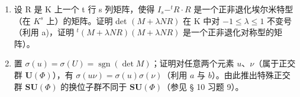 \begin{enumerate}
\def\labelenumi{\alph{enumi})}
\setcounter{enumi}{1}
\item
  设 R 是 K 上一个 t 行 s 列矩阵，使得 \(I_{s} - ^{t}R \cdot R\) 是一个正非退化埃尔米特型（在 \(K^{s}\) 上）的矩阵。证明 det \((M + \lambda NR)\) 在 K 中对 \(-1 \leqslant \lambda \leqslant 1\) 不变号（利用 a)，证明 \(^{t}(M + \lambda NR)(M + \lambda NR)\) 是一个正非退化对称型的矩阵）。
\item
  置 \(\sigma(u) = \sigma(U) = \operatorname{sgn}(\det M)\)；证明对任意两个元素 \(u\)、\(\nu\)（属于正交群 \(\mathbf{U}(\Phi)\)），有 \(\sigma(u\nu) = \sigma(u)\sigma(\nu)\)（利用 \(a\) 与 \(b\)）。由此推出特殊正交群 \(\mathbf{SU}(\Phi)\) 的换位子群不同于 \(\mathbf{SU}(\Phi)\)（参见 § 10 习题 9）。
\end{enumerate}

